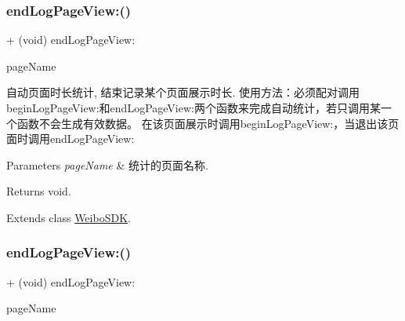 \mbox{\label{category_weibo_s_d_k_07_statistics_08_aa9460b8e4fd90f3b437207c55ef2c40e}} 
\subsubsection{\texorpdfstring{end\+Log\+Page\+View\+:()}{endLogPageView:()}\hspace{0.1cm}{\footnotesize\ttfamily [1/3]}}
{\footnotesize\ttfamily + (void) end\+Log\+Page\+View\+: \begin{DoxyParamCaption}\item[{(N\+S\+String $\ast$)}]{page\+Name }\end{DoxyParamCaption}}

自动页面时长统计, 结束记录某个页面展示时长. 使用方法：必须配对调用begin\+Log\+Page\+View\+:和end\+Log\+Page\+View\+:两个函数来完成自动统计，若只调用某一个函数不会生成有效数据。 在该页面展示时调用begin\+Log\+Page\+View\+:，当退出该页面时调用end\+Log\+Page\+View\+: 
\begin{DoxyParams}{Parameters}
{\em page\+Name} & 统计的页面名称. \\
\hline
\end{DoxyParams}
\begin{DoxyReturn}{Returns}
void. 
\end{DoxyReturn}


Extends class \mbox{\hyperlink{interface_weibo_s_d_k_aa9460b8e4fd90f3b437207c55ef2c40e}{Weibo\+S\+DK}}.

\mbox{\label{category_weibo_s_d_k_07_statistics_08_aa9460b8e4fd90f3b437207c55ef2c40e}} 
\subsubsection{\texorpdfstring{end\+Log\+Page\+View\+:()}{endLogPageView:()}\hspace{0.1cm}{\footnotesize\ttfamily [2/3]}}
{\footnotesize\ttfamily + (void) end\+Log\+Page\+View\+: \begin{DoxyParamCaption}\item[{(N\+S\+String $\ast$)}]{page\+Name }\end{DoxyParamCaption}}

